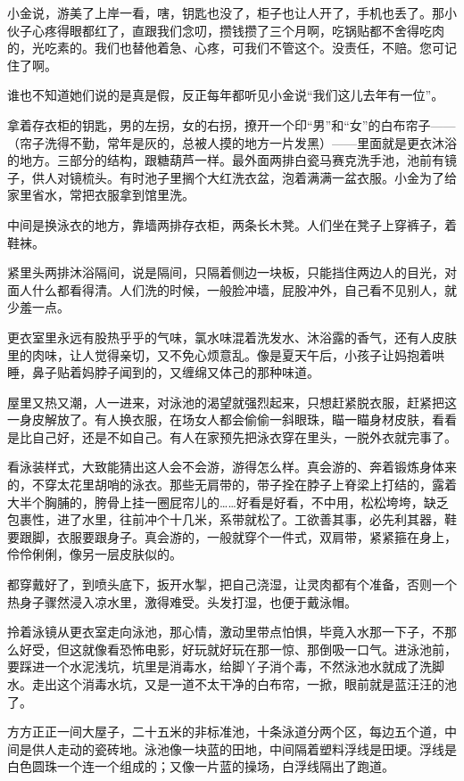 \documentclass[lang=cn,newtx,12pt,scheme=chinese]{elegantbook}
\begin{document}
小金说，游美了上岸一看，嗐，钥匙也没了，柜子也让人开了，手机也丢了。那小伙子心疼得眼都红了，直跟我们念叨，攒钱攒了三个月啊，吃锅贴都不舍得吃肉的，光吃素的。我们也替他着急、心疼，可我们不管这个。没责任，不赔。您可记住了啊。

谁也不知道她们说的是真是假，反正每年都听见小金说“我们这儿去年有一位”。

拿着存衣柜的钥匙，男的左拐，女的右拐，撩开一个印“男”和“女”的白布帘子——（帘子洗得不勤，常年是灰的，总被人摸的地方一片发黑）——里面就是更衣沐浴的地方。三部分的结构，跟糖葫芦一样。最外面两排白瓷马赛克洗手池，池前有镜子，供人对镜梳头。有时池子里搁个大红洗衣盆，泡着满满一盆衣服。小金为了给家里省水，常把衣服拿到馆里洗。

中间是换泳衣的地方，靠墙两排存衣柜，两条长木凳。人们坐在凳子上穿裤子，着鞋袜。

紧里头两排沐浴隔间，说是隔间，只隔着侧边一块板，只能挡住两边人的目光，对面人什么都看得清。人们洗的时候，一般脸冲墙，屁股冲外，自己看不见别人，就少羞一点。

更衣室里永远有股热乎乎的气味，氯水味混着洗发水、沐浴露的香气，还有人皮肤里的肉味，让人觉得亲切，又不免心烦意乱。像是夏天午后，小孩子让妈抱着哄睡，鼻子贴着妈脖子闻到的，又缠绵又体己的那种味道。

屋里又热又潮，人一进来，对泳池的渴望就强烈起来，只想赶紧脱衣服，赶紧把这一身皮解放了。有人换衣服，在场女人都会偷偷一斜眼珠，瞄一瞄身材皮肤，看看是比自己好，还是不如自己。有人在家预先把泳衣穿在里头，一脱外衣就完事了。

看泳装样式，大致能猜出这人会不会游，游得怎么样。真会游的、奔着锻炼身体来的，不穿太花里胡哨的泳衣。那些无肩带的，带子拴在脖子上脊梁上打结的，露着大半个胸脯的，胯骨上挂一圈屁帘儿的……好看是好看，不中用，松松垮垮，缺乏包裹性，进了水里，往前冲个十几米，系带就松了。工欲善其事，必先利其器，鞋要跟脚，衣服要跟身子。真会游的，一般就穿个一件式，双肩带，紧紧箍在身上，伶伶俐俐，像另一层皮肤似的。

都穿戴好了，到喷头底下，扳开水掣，把自己浇湿，让灵肉都有个准备，否则一个热身子骤然浸入凉水里，激得难受。头发打湿，也便于戴泳帽。

拎着泳镜从更衣室走向泳池，那心情，激动里带点怕惧，毕竟入水那一下子，不那么好受，但这就像看恐怖电影，好玩就好玩在那一惊、那倒吸一口气。进泳池前，要踩进一个水泥浅坑，坑里是消毒水，给脚丫子消个毒，不然泳池水就成了洗脚水。走出这个消毒水坑，又是一道不太干净的白布帘，一掀，眼前就是蓝汪汪的池了。

方方正正一间大屋子，二十五米的非标准池，十条泳道分两个区，每边五个道，中间是供人走动的瓷砖地。泳池像一块蓝的田地，中间隔着塑料浮线是田埂。浮线是白色圆珠一个连一个组成的；又像一片蓝的操场，白浮线隔出了跑道。
\end{document}
